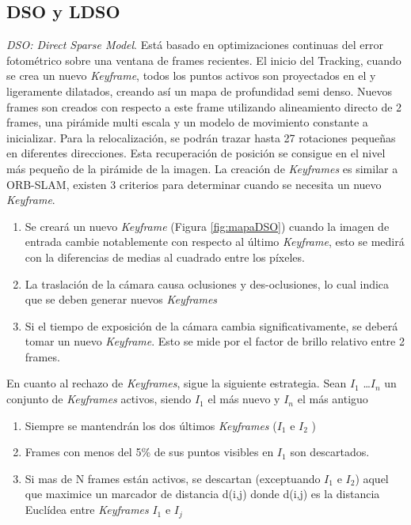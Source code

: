 \subsection{DSO y LDSO}
\textit{DSO: Direct Sparse Model}.
Está basado en optimizaciones continuas del error fotométrico sobre una ventana de frames recientes\cite{Engel2016direct}.
El inicio del Tracking, cuando se crea un nuevo \textit{Keyframe}, todos los puntos activos son proyectados en el y ligeramente dilatados, creando así un mapa de profundidad semi denso. Nuevos frames son creados con respecto a este frame utilizando alineamiento directo de 2 frames, una pirámide multi escala y un modelo de movimiento constante a inicializar. 
Para la relocalización, se podrán trazar hasta 27 rotaciones pequeñas en diferentes direcciones. Esta recuperación de posición se consigue en el nivel más pequeño de la pirámide de la imagen.
La creación de \textit{Keyframes} es similar a ORB-SLAM, existen 3 criterios para determinar cuando se necesita un nuevo \textit{Keyframe}.
\begin {enumerate}
\item Se creará un nuevo \textit{Keyframe} (Figura \ref{fig:mapaDSO}) cuando la imagen de entrada cambie notablemente con respecto al último \textit{Keyframe}, esto se medirá con la diferencias de medias al cuadrado entre los píxeles.
\item La traslación de la cámara causa oclusiones y des-oclusiones, lo cual indica que se deben generar nuevos \textit{Keyframes}
\item Si el tiempo de exposición de la cámara cambia significativamente, se deberá tomar un nuevo \textit{Keyframe}. Esto se mide por el factor de brillo relativo entre 2 frames. 
\end {enumerate}

En cuanto al rechazo de \textit{Keyframes}, sigue la siguiente estrategia. Sean $I_1$ \dots $I_n$ un conjunto de \textit{Keyframes} activos, siendo $I_1$ el más nuevo y $I_n$ el más antiguo
\begin {enumerate}
\item Siempre se mantendrán los dos últimos \textit{Keyframes} ($I_1$  e $I_2$ )
\item Frames con menos del 5\% de sus puntos visibles en $I_1$  son descartados.
\item Si mas de N frames están activos, se descartan (exceptuando $I_1$  e $I_2$) aquel que maximice un marcador de distancia d(i,j) donde d(i,j) es la distancia Euclídea entre \textit{Keyframes} $I_1$  e $I_j$
\end {enumerate}

